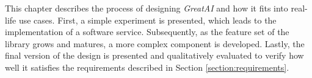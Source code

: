 This chapter describes the process of designing \textit{GreatAI} and how it fits into real-life use cases. First, a simple experiment is presented, which leads to the implementation of a software service. Subsequently, as the feature set of the library grows and matures, a more complex component is developed. Lastly, the final version of the design is presented and qualitatively evaluated to verify how well it satisfies the requirements described in Section \ref{section:requirements}.



